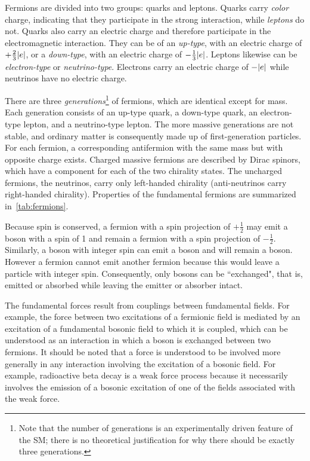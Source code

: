 Fermions are divided into two groups: quarks and leptons. Quarks carry
\textit{color} charge, indicating that they participate in the strong
interaction, while \textit{leptons} do not. Quarks also carry an electric charge
and therefore participate in the electromagnetic interaction. They can be of an
\emph{up-type}, with an electric charge of $+\frac{2}{3}\lvert e\rvert$, or a
\emph{down-type}, with an electric charge of $-\frac{1}{3}\lvert e\rvert$. Leptons
likewise can be \emph{electron-type} or \emph{neutrino-type}. Electrons carry an
electric charge of $-\lvert e\rvert$ while neutrinos have no electric charge.

There are three \textit{generations}\footnote{Note that the number of
generations is an experimentally driven feature of the SM; there is no
theoretical justification for why there should be exactly three generations.} of
fermions, which are identical except for mass. Each generation consists of an
up-type quark, a down-type quark, an electron-type lepton, and a neutrino-type
lepton. The more massive generations are not stable, and ordinary matter is
consequently made up of first-generation particles. For each fermion, a
corresponding antifermion with the same mass but with opposite charge exists.
Charged massive fermions are described by Dirac spinors, which have a component
for each of the two chirality states. The uncharged fermions, the neutrinos,
carry only left-handed chirality (anti-neutrinos carry right-handed chirality).
Properties of the fundamental fermions are summarized in~\cref{tab:fermions}.

Because spin is conserved, a fermion with a spin projection of $+\frac{1}{2}$
may emit a boson with a spin of 1 and remain a fermion with a spin projection of
$-\frac{1}{2}$.  Similarly, a boson with integer spin can emit a boson and will
remain a boson. However a fermion cannot emit another fermion because this would
leave a particle with integer spin. Consequently, only bosons can be
``exchanged", that is, emitted or absorbed while leaving the emitter or absorber
intact.

The fundamental forces result from couplings between fundamental fields. For
example, the force between two excitations of a fermionic field is mediated by
an excitation of a fundamental bosonic field to which it is coupled, which can
be understood as an interaction in which a boson is exchanged between two
fermions. It should be noted that a force is understood to be involved more
generally in any interaction involving the excitation of a bosonic field. For
example, radioactive beta decay is a weak force process because it necessarily
involves the emission of a bosonic excitation of one of the fields associated
with the weak force.

